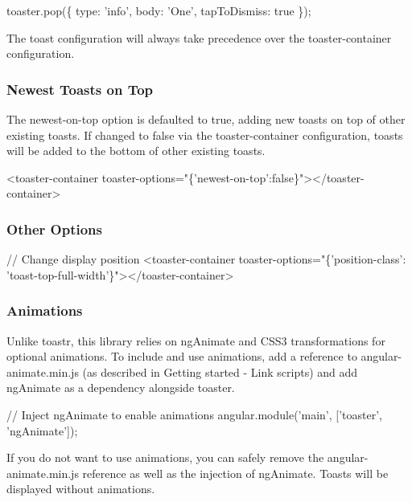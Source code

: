 \begin{DoxyCode}
toaster.pop(\{ type: 'info', body: 'One', tapToDismiss: true \});
\end{DoxyCode}


The toast configuration will always take precedence over the toaster-\/container configuration.

\subsubsection*{Newest Toasts on Top}

The {\ttfamily newest-\/on-\/top} option is defaulted to true, adding new toasts on top of other existing toasts. If changed to false via the toaster-\/container configuration, toasts will be added to the bottom of other existing toasts.


\begin{DoxyCode}
<toaster-container toaster-options="\{'newest-on-top':false\}"></toaster-container>
\end{DoxyCode}


\subsubsection*{Other Options}


\begin{DoxyCode}
// Change display position
<toaster-container toaster-options="\{'position-class': 'toast-top-full-width'\}"></toaster-container>
\end{DoxyCode}


\subsubsection*{Animations}

Unlike toastr, this library relies on ng\+Animate and C\+S\+S3 transformations for optional animations. To include and use animations, add a reference to angular-\/animate.\+min.\+js (as described in Getting started -\/ Link scripts) and add ng\+Animate as a dependency alongside toaster.


\begin{DoxyCode}
// Inject ngAnimate to enable animations
angular.module('main', ['toaster', 'ngAnimate']);
\end{DoxyCode}
 If you do not want to use animations, you can safely remove the angular-\/animate.\+min.\+js reference as well as the injection of ng\+Animate. Toasts will be displayed without animations.

